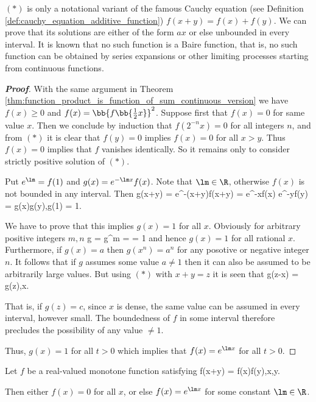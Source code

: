 \begin{remark}
$(*)$ is only a notational variant of the famous Cauchy equation (see Definition \ref{def:cauchy_equation_additive_function}) $f(x+y) = f(x) + f(y)$. We can prove that its solutions are either of the form $ax$ or else unbounded in every interval. It is known that no such function is a Baire function, that is, no such function can be obtained by series expansions or other limiting processes starting from continuous functions.
\end{remark}

\begin{proof}[\bf Proof]
With the same argument in Theorem \ref{thm:function_product_is_function_of_sum_continuous_version} we have $f(x)\geq 0$ and $f(x) = \bb{f\bb{\frac 12 x}}^2$. Suppose first that $f(x) =0$ for same value $x$. Then we conclude by induction that $f(2^{-n}x) = 0$ for all integers $n$, and from $(*)$ it is clear that $f(y)=0$ implies $f(x)=0$ for all $x>y$. Thus $f(x)=0$ implies that $f$ vanishes identically. So it remains only to consider strictly positive solution of $(*)$.

Put $e^{\lm} = f(1)$ and $g(x) = e^{-\lm x}f(x)$. Note that $\lm\in\R$, otherwise $f(x)$ is not bounded in any interval. Then
\be
g(x+y) = e^{-\lm (x+y)}f(x+y) = e^{-\lm x}f(x) e^{-\lm y}f(y) = g(x)g(y),\qquad g(1) = 1.
\ee

We have to prove that this implies $g(x) = 1$ for all $x$. Obviously for arbitrary positive integers $m,n$
\be
g = g^m =  = 1
\ee
and hence $g(x) =1$ for all rational $x$. Furthermore, if $g(x) =a$ then $g(x^n) = a^n$ for any posotive or negative integer $n$. It follows that if $g$ assumes some value $a\neq 1$ then it can also be assumed to be arbitrarily large values. But using $(*)$ with $x+y = z$ it is seen that
\be
g(z-x) = g(z),\qquad x\in \Q.
\ee

That is, if $g(z) = c$, since $x$ is dense, the same value can be assumed in every interval, however small. The boundedness of $f$ in some interval therefore precludes the possibility of any value $\neq 1$.

Thus, $g(x) =1$ for all $t>0$ which implies that $f(x) = e^{\lm x}$ for all $t>0$.
\end{proof}

\begin{corollary}
Let $f$ be a real-valued monotone function satisfying
\be
f(x+y) = f(x)f(y),\qquad x,y\in \R.
\ee

Then either $f(x)=0$ for all $x$, or else $f(x) = e^{\lm x}$ for some constant $\lm\in\R$.
\end{corollary}


